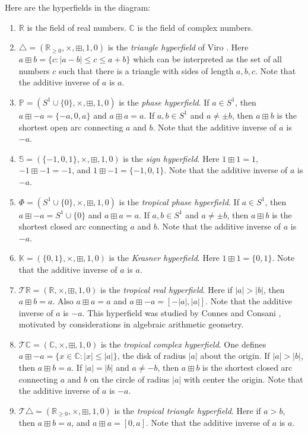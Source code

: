 \documentclass[10pt, preprint]{article}
\theoremstyle{definition}
\begin{document}
Here are the hyperfields in the diagram:
%
\begin{enumerate}%
\item
$\mathbb{R}$ is the field of real numbers. $\mathbb{C}$ is the field of
complex numbers.
%
\item
$\triangle = (\mathbb{R}_{\geq 0}, \times , \boxplus , 1,0) $ is the
\emph{triangle hyperfield} of Viro \cite{Viro}. Here $a \boxplus
b =\{ c : |a-b| \leq c \leq a+b\}$ which can be interpreted as the set
of all numbers $c$ such that there is a triangle with sides of length
$a, b, c$. Note that the additive inverse of $a$ is $a$.
%
\item
$\mathbb{P}= (S^{1} \cup \{0\}, \times , \boxplus , 1, 0)$ is the
\emph{phase hyperfield}. If $a \in S^{1}$, then $a \boxplus -a = \{-a,0,a
\}$ and $a \boxplus a = a$. If $a, b \in S^{1}$ and $a \neq \pm b$,
then $a \boxplus b$ is the shortest open arc connecting $a$ and $b$.
Note that the additive inverse of $a$ is $-a$.
%
\item
$\mathbb{S}=(\{-1,0,1\},\times , \boxplus , 1, 0)$ is the \emph{sign
hyperfield}. Here $1 \boxplus 1 = 1$, $-1 \boxplus -1 = -1$, and
$1 \boxplus -1 = \{-1,0,1\}$. Note that the additive inverse of $a$ is
$-a$.
%
\item
$\Phi = (S^{1} \cup \{0\}, \times , \boxplus , 1, 0)$ is the
\emph{tropical phase hyperfield}. If $a \in S^{1}$, then $a \boxplus -a
= S^{1} \cup \{0\}$ and $a \boxplus a = a$. If $a, b \in S^{1}$ and
$a \neq \pm b$, then $a \boxplus b$ is the shortest closed arc
connecting $a$ and $b$. Note that the additive inverse of $a$ is $-a$.
%
\item
$\mathbb{K}= (\{0,1\},\times , \boxplus , 1, 0)$ is the \emph{Krasner
hyperfield}. Here $1 \boxplus 1 = \{0,1\}$. Note that the additive
inverse of $a$ is $a$.
%
\item
${\mathcal T} \mathbb{R}= (\mathbb{R},\times , \boxplus , 1, 0)$ is the
\emph{tropical real hyperfield}. Here if $|a| > |b|$, then $a \boxplus
b = a$. Also $a \boxplus a = a$ and $a \boxplus -a = [-|a|,|a|]$. Note
that the additive inverse of $a$ is $-a$. This hyperfield was studied
by Connes and Consani \cite{Connes-Consani}, motivated by
considerations in algebraic arithmetic geometry.
%
\item
${\mathcal T} \mathbb{C}= (\mathbb{C},\times , \boxplus , 1, 0)$ is the
\emph{tropical complex hyperfield}. One defines $a \boxplus -a = \{x
\in \mathbb{C}: |x| \leq |a| \}$, the disk of radius $|a|$ about the
origin. If $|a| > |b|$, then $a \boxplus b = a$. If $|a| = |b|$ and
$a \neq -b$, then $a \boxplus b$ is the shortest closed arc connecting
$a$ and $b$ on the circle of radius $|a|$ with center the origin. Note
that the additive inverse of $a$ is $-a$.
%
\item
${\mathcal T}\triangle = (\mathbb{R}_{\geq 0},\times , \boxplus , 1, 0)$ is
the \emph{tropical triangle hyperfield}. Here if $a > b$, then
$a \boxplus b = a$, and $a \boxplus a = [0, a]$. Note that the additive
inverse of $a$ is $a$.


\end{enumerate}
\end{document}
